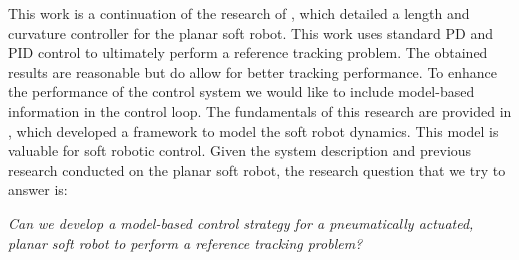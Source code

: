 This work is a continuation of the research of \cite{berkers}, which detailed a length and curvature controller for the planar soft robot. This work uses standard PD and PID control to ultimately perform a reference tracking problem. The obtained results are reasonable but do allow for better tracking performance. To enhance the performance of the control system we would like to include model-based information in the control loop. The fundamentals of this research are provided in \cite{Caasenbrood2020}, which developed a framework to model the soft robot dynamics. This model is valuable for soft robotic control. Given the system description and previous research conducted on the planar soft robot, the research question that we try to answer is:

\textit{Can we develop a model-based control strategy for a pneumatically actuated, planar soft robot to perform a reference tracking problem?}

